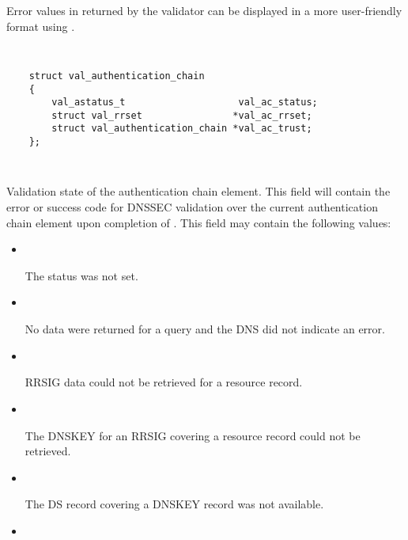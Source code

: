 \begin{description}
\begin{description}
Error values in  returned by the validator can be displayed
in a more user-friendly format using .

\end{description}

\item {}\verb" "

\begin{verbatim}
    struct val_authentication_chain
    {
        val_astatus_t                    val_ac_status;
        struct val_rrset                *val_ac_rrset;
        struct val_authentication_chain *val_ac_trust;
    };
\end{verbatim}

\begin{description}

\item {}\verb" "

Validation state of the authentication chain element.  This field will contain
the error or success code for DNSSEC validation over the current authentication
chain element upon completion of .  This field
may contain the following values:

\begin{itemize}

\item {}\verb" "

The status was not set.

\item {}\verb" "

No data were returned for a query and the DNS did not indicate an error.

\item {}\verb" "

RRSIG data could not be retrieved for a resource record.

\item {}\verb" "

The DNSKEY for an RRSIG covering a resource record could not be retrieved.

\item {}\verb" "

The DS record covering a DNSKEY record was not available.

\item {}\verb" "


\end{itemize}
\end{description}
\end{description}
